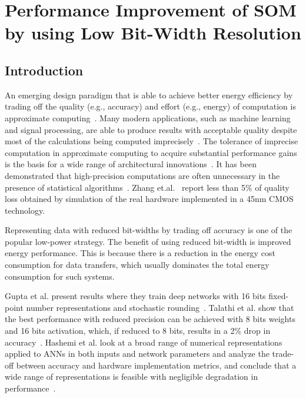 \documentclass[a4paper,10pt]{article}
\begin{document}
\section{Performance Improvement of SOM by using Low Bit-Width Resolution}
\subsection{Introduction}
An emerging design paradigm that is able to achieve better energy efficiency by trading off the quality (e.g., accuracy) and effort (e.g., energy) of computation is approximate computing~\cite{Zhang2014}. Many modern applications, such as machine learning and signal processing, are able to produce results with acceptable quality despite most of the calculations being computed imprecisely~\cite{Ye2013}. The tolerance of imprecise computation in approximate computing to acquire substantial performance gains is the basis for a wide range of architectural innovations~\cite{Esmaeilzadeh2012}. It has been demonstrated that high-precision computations are often unnecessary in the presence of statistical algorithms~\cite{Moons2017,Zhang2015}. Zhang et.al.~\cite{Zhang2015} report less than 5\% of quality loss obtained by simulation of the real hardware implemented in a 45nm CMOS technology.

Representing data with reduced bit-widths by trading off accuracy is one of the popular low-power strategy. The benefit of using reduced bit-width is improved energy performance. This is because there is a reduction in the energy cost consumption for data transfers, which usually dominates the total energy consumption for such systems.

Gupta et al. present results where they train deep networks with 16 bits fixed-point number representations and stochastic rounding~\cite{Gupta2015}. Talathi et al. show that the best performance with reduced precision can be achieved with 8 bits weights and 16 bits activation, which, if reduced to 8 bits, results in a 2\% drop in accuracy~\cite{lin2016overcoming}. Hashemi et al. look at a broad range of numerical representations applied to ANNs in both inputs and network parameters and analyze the trade-off between accuracy and hardware implementation metrics, and conclude that a wide range of representations is feasible with negligible degradation in performance~\cite{Hashemi2017}.
\end{document}
